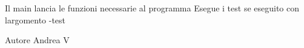 Il main lancia le funzioni necessarie al programma Esegue i test se eseguito con l\textquotesingle{}argomento -\/test \begin{DoxyAuthor}{Autore}
Andrea V 
\end{DoxyAuthor}
